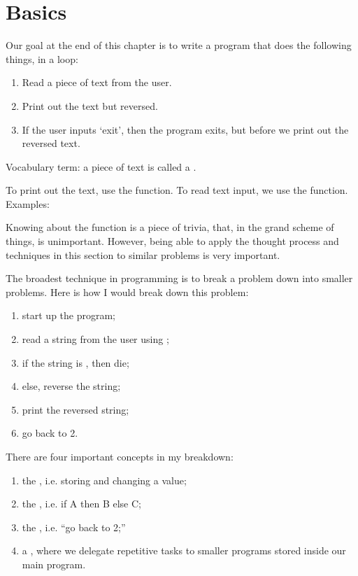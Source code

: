 \chapter{Basics}

Our goal at the end of this chapter is to write a program that does
the following things, in a loop:

\begin{enumerate}
\item Read a piece of text from the user.
\item Print out the text but reversed.
\item If the user inputs `exit', then the program exits, but before
  we print out the reversed text.
\end{enumerate}

Vocabulary term: a piece of text is called a .

To print out the text, use the  function. To read text
input, we use the  function. Examples:


Knowing about the function  is a piece of trivia, that,
in the grand scheme of things, is unimportant. However, being able to
apply the thought process and techniques in this section to similar
problems is very important.

The broadest technique in programming is to break a problem down into
smaller problems. Here is how I would break down this problem:

\begin{enumerate}
\item start up the program;
\item read a string from the user using ;
\item if the string is , then die;
\item else, reverse the string;
\item print the reversed string;
\item go back to 2.
\end{enumerate}

There are four important concepts in my breakdown:

\begin{enumerate}
\item the , i.e. storing and changing a value;
\item the , i.e. if A then B else C;
\item the , i.e. ``go back to 2;''
\item a , where we delegate repetitive tasks to
  smaller programs stored inside our main program.
\end{enumerate}

